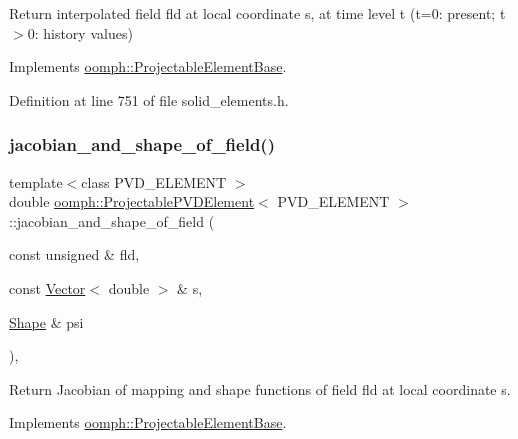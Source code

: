 Return interpolated field fld at local coordinate s, at time level t (t=0\+: present; t$>$0\+: history values) 



Implements \hyperlink{classoomph_1_1ProjectableElementBase_ae4da5b565b6d333be2f5920f7be763cd}{oomph\+::\+Projectable\+Element\+Base}.



Definition at line 751 of file solid\+\_\+elements.\+h.

\mbox{\label{classoomph_1_1ProjectablePVDElement_afc3aa618b5fe62f6389a620b45fcae2a}} 
\subsubsection{\texorpdfstring{jacobian\+\_\+and\+\_\+shape\+\_\+of\+\_\+field()}{jacobian\_and\_shape\_of\_field()}}
{\footnotesize\ttfamily template$<$class P\+V\+D\+\_\+\+E\+L\+E\+M\+E\+NT $>$ \\
double \hyperlink{classoomph_1_1ProjectablePVDElement}{oomph\+::\+Projectable\+P\+V\+D\+Element}$<$ P\+V\+D\+\_\+\+E\+L\+E\+M\+E\+NT $>$\+::jacobian\+\_\+and\+\_\+shape\+\_\+of\+\_\+field (\begin{DoxyParamCaption}\item[{const unsigned \&}]{fld,  }\item[{const \hyperlink{classoomph_1_1Vector}{Vector}$<$ double $>$ \&}]{s,  }\item[{\hyperlink{classoomph_1_1Shape}{Shape} \&}]{psi }\end{DoxyParamCaption})\hspace{0.3cm}{\ttfamily [inline]}, {\ttfamily [virtual]}}



Return Jacobian of mapping and shape functions of field fld at local coordinate s. 



Implements \hyperlink{classoomph_1_1ProjectableElementBase_ad45c21b58c0985d52f68ab2d79cbb488}{oomph\+::\+Projectable\+Element\+Base}.



